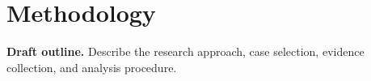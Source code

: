 \chapter{Methodology}
\label{chap:methodology}

\textbf{Draft outline.} Describe the research approach, case selection,
evidence collection, and analysis procedure.

